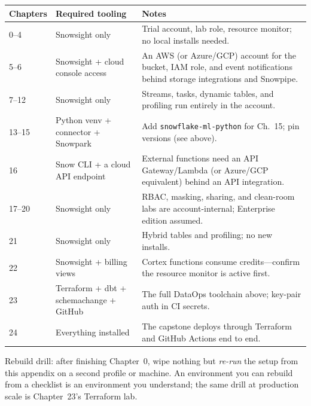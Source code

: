 \begin{center}
\footnotesize
\begin{tabular}{@{}p{3.4cm}p{4.6cm}p{6.2cm}@{}}
\toprule
\textbf{Chapters} & \textbf{Required tooling} & \textbf{Notes} \\
\midrule
0--4 & Snowsight only & Trial account, lab role, resource monitor; no local installs needed. \\
5--6 & Snowsight + cloud console access & An AWS (or Azure/GCP) account for the bucket, IAM role, and event notifications behind storage integrations and Snowpipe. \\
7--12 & Snowsight only & Streams, tasks, dynamic tables, and profiling run entirely in the account. \\
13--15 & Python venv + connector + Snowpark & Add \texttt{snowflake-ml-python} for Ch.~15; pin versions (see above). \\
16 & Snow CLI + a cloud API endpoint & External functions need an API Gateway/Lambda (or Azure/GCP equivalent) behind an API integration. \\
17--20 & Snowsight only & RBAC, masking, sharing, and clean-room labs are account-internal; Enterprise edition assumed. \\
21 & Snowsight only & Hybrid tables and profiling; no new installs. \\
22 & Snowsight + billing views & Cortex functions consume credits---confirm the resource monitor is active first. \\
23 & Terraform + dbt + schemachange + GitHub & The full DataOps toolchain above; key-pair auth in CI secrets. \\
24 & Everything installed & The capstone deploys through Terraform and GitHub Actions end to end. \\
\bottomrule
\end{tabular}
\end{center}

\begin{tipbox}
Rebuild drill: after finishing Chapter~0, wipe nothing but \emph{re-run} the setup from this
appendix on a second profile or machine. An environment you can rebuild from a checklist is an
environment you understand; the same drill at production scale is Chapter~23's Terraform lab.
\end{tipbox}
